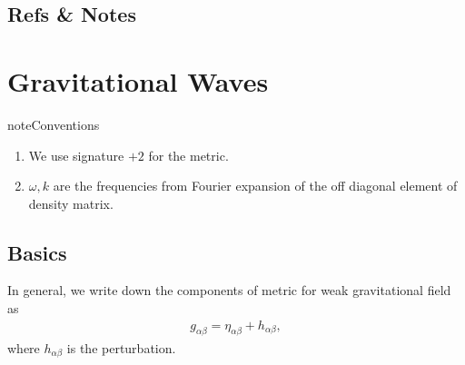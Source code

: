 \documentclass[letterpaper,12pt,english]{sphinxmanual}
\begin{document}
\subsection{Refs \& Notes}
\label{\detokenize{gravity/equation-of-motion:refs-notes}}

\section{Gravitational Waves}
\label{\detokenize{gravity/gravitational-waves:gravitational-waves}}\label{\detokenize{gravity/gravitational-waves::doc}}
\begin{sphinxadmonition}{note}{Conventions}
\begin{enumerate}
\item {} 
We use signature \(+2\) for the metric.

\item {} 
\(\omega,k\) are the frequencies from Fourier expansion of the off diagonal element of density matrix.

\end{enumerate}
\end{sphinxadmonition}


\subsection{Basics}
\label{\detokenize{gravity/gravitational-waves:basics}}
In general, we write down the components of metric for weak gravitational field as
\begin{equation*}
\begin{split}g_{\alpha\beta} = \eta_{\alpha\beta} + h_{\alpha\beta},\end{split}
\end{equation*}
where \(h_{\alpha\beta}\) is the perturbation.
\end{document}
